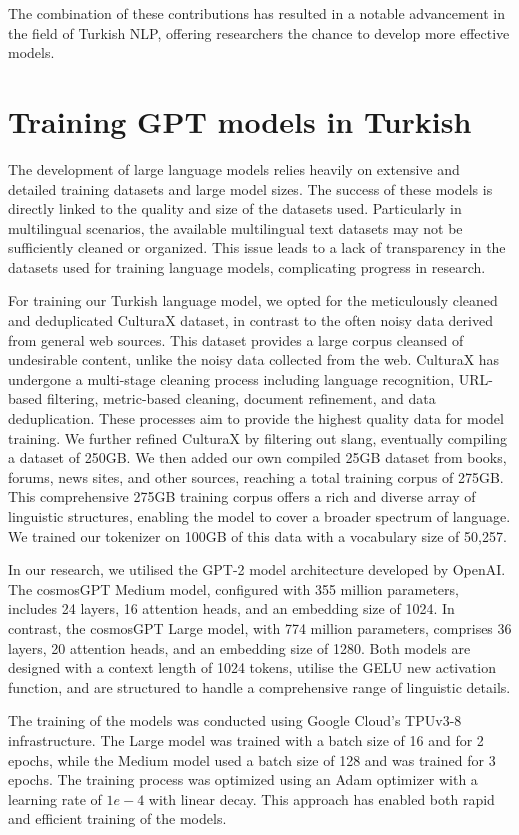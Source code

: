\documentclass[conference]{IEEEtran}
\begin{document}
The combination of these contributions has resulted in a notable advancement in the field of Turkish NLP, offering researchers the chance to develop more effective models.  

\section{Training GPT models in Turkish}
The development of large language models relies heavily on extensive and detailed training datasets and large model sizes. 
The success of these models is directly linked to the quality and size of the datasets used.
Particularly in multilingual scenarios, the available multilingual text datasets may not be sufficiently cleaned or organized. 
This issue leads to a lack of transparency in the datasets used for training language models, complicating progress in research.

For training our Turkish language model, we opted for the meticulously cleaned and deduplicated CulturaX dataset, in contrast to the often noisy data derived from general web sources. This dataset provides a large corpus cleansed of undesirable content, unlike the noisy data collected from the web. CulturaX has undergone a multi-stage cleaning process including language recognition, URL-based filtering, metric-based cleaning, document refinement, and data deduplication. These processes aim to provide the highest quality data for model training. We further refined CulturaX by filtering out slang, eventually compiling a dataset of 250GB. We then added our own compiled 25GB dataset from books, forums, news sites, and other sources, reaching a total training corpus of 275GB. This comprehensive 275GB training corpus offers a rich and diverse array of linguistic structures, enabling the model to cover a broader spectrum of language. We trained our tokenizer on 100GB of this data with a vocabulary size of 50,257.

In our research, we utilised the GPT-2 model architecture developed by OpenAI. The cosmosGPT Medium model, configured with 355 million parameters, includes 24 layers, 16 attention heads, and an embedding size of 1024. In contrast, the cosmosGPT Large model, with 774 million parameters, comprises 36 layers, 20 attention heads, and an embedding size of 1280. Both models are designed with a context length of 1024 tokens, utilise the GELU new activation function, and are structured to handle a comprehensive range of linguistic details.

The training of the models was conducted using Google Cloud's TPUv3-8 infrastructure. The Large model was trained with a batch size of 16 and for 2 epochs, while the Medium model used a batch size of 128 and was trained for 3 epochs. The training process was optimized using an Adam optimizer with a learning rate of $1e-4$ with linear decay. This approach has enabled both rapid and efficient training of the models.
\end{document}
